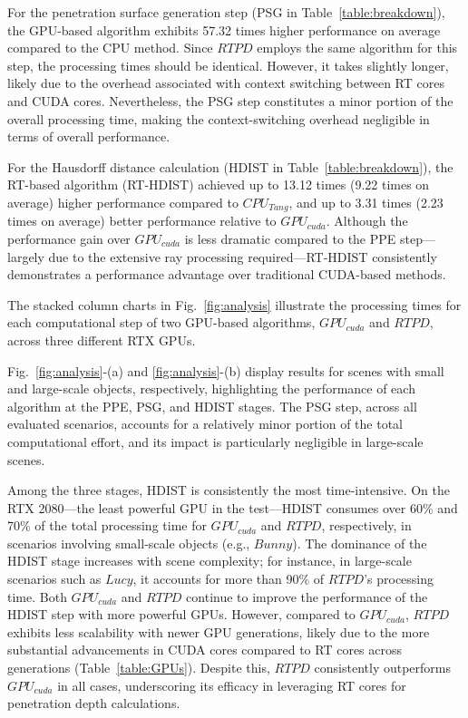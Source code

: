 For the penetration surface generation step (PSG in Table~\ref{table:breakdown}), the GPU-based algorithm exhibits 57.32 times higher performance on average compared to the CPU method.
Since $RTPD$ employs the same algorithm for this step, the processing times should be identical. However, it takes slightly longer, likely due to the overhead associated with context switching between RT cores and CUDA cores.
Nevertheless, the PSG step constitutes a minor portion of the overall processing time, making the context-switching overhead negligible in terms of overall performance.

For the Hausdorff distance calculation (HDIST in Table~\ref{table:breakdown}), the RT-based algorithm (RT-HDIST) achieved up to 13.12 times (9.22 times on average) higher performance compared to $CPU_{Tang}$, and up to 3.31 times (2.23 times on average) better performance relative to $GPU_{cuda}$.
Although the performance gain over $GPU_{cuda}$ is less dramatic compared to the PPE step—largely due to the extensive ray processing required—RT-HDIST consistently demonstrates a performance advantage over traditional CUDA-based methods.

The stacked column charts in Fig.~\ref{fig:analysis} illustrate the processing times for each computational step of two GPU-based algorithms, $GPU_{cuda}$ and $RTPD$, across three different RTX GPUs.

Fig.~\ref{fig:analysis}-(a) and \ref{fig:analysis}-(b) display results for scenes with small and large-scale objects, respectively, highlighting the performance of each algorithm at the PPE, PSG, and HDIST stages.
The PSG step, across all evaluated scenarios, accounts for a relatively minor portion of the total computational effort, and its impact is particularly negligible in large-scale scenes.

Among the three stages, HDIST is consistently the most time-intensive.
On the RTX 2080—the least powerful GPU in the test—HDIST consumes over 60\% and 70\% of the total processing time for $GPU_{cuda}$ and $RTPD$, respectively, in scenarios involving small-scale objects (e.g., $Bunny$).
The dominance of the HDIST stage increases with scene complexity; for instance, in large-scale scenarios such as $Lucy$, it accounts for more than 90\% of $RTPD$'s processing time.
Both $GPU_{cuda}$ and $RTPD$ continue to improve the performance of the HDIST step with more powerful GPUs.
However, compared to $GPU_{cuda}$, $RTPD$ exhibits less scalability with newer GPU generations, likely due to the more substantial advancements in CUDA cores compared to RT cores across generations (Table~\ref{table:GPUs}).
Despite this, $RTPD$ consistently outperforms $GPU_{cuda}$ in all cases, underscoring its efficacy in leveraging RT cores for penetration depth calculations.

